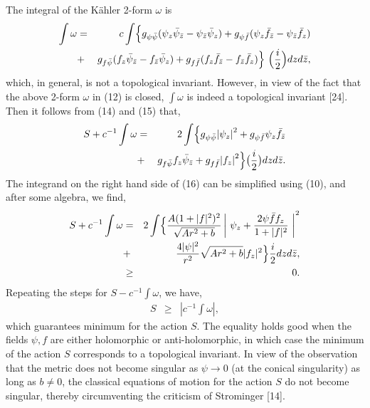 \documentclass[a4paper,12pt]{article}
\begin{document}
{{\vspace{0.5cm}

The integral of the K\"{a}hler 2-form $\omega$ is
\begin{eqnarray}
\int \omega &=& c\int \Bigl \{ g_{\psi \bar{\psi}}({\psi}_z{\bar{\psi}}
_{\bar{z}}-{\psi}_{\bar{z}}{\bar{\psi}}_z)
+g_{\psi \bar{f}}({\psi}_z{\bar{f}}_
{\bar{z}}-{\psi}_{\bar{z}}{\bar{f}}_z) \nonumber \\
&+& g_{f\bar{\psi}}(f_z{\bar{\psi}}_{\bar{z}}-f_{\bar{z}}{\bar{\psi}}_z)
+g_{f\bar{f}}(f_z{\bar{f}}_{\bar{z}}-f_{\bar{z}}{\bar{f}}_z)\Bigr\}\ 
 \Big(\frac{i}{2}\Big) dz d\bar{z},
\end{eqnarray}
which, in general, is not a topological invariant. However, in view of the fact 
that the above 2-form $\omega$ in (12) is closed, $\int \omega$ is 
indeed a topological invariant [24]. Then it follows from (14) and (15) that,
\begin{eqnarray}
S+c^{-1}\int \omega &=& 2\int \Bigl\{ g_{\psi \bar{\psi}}{|{\psi}_z|}^2
+g_{\psi \bar{f}}{\psi}_z {\bar{f}}_{\bar{z}} \nonumber \\
&+& g_{f\bar{\psi}} f_z {\bar{\psi}}_{\bar{z}}+g_{f\bar{f}}{|f_z|}^2
\Bigr\} \big( \frac{i}{2}\big) dz d\bar{z}.
\end{eqnarray}
The integrand on the right hand side of (16) can be simplified using (10),
and after some algebra, we find,
\begin{eqnarray}
S+c^{-1}\int \omega &=& 2\int \Bigl\{ \frac{A(1+|f|^2)^2}{\sqrt{Ar^2+b}}
\left |\ {\psi}_z + \frac{2\psi \bar{f} f_z}{1+|f|^2}\ \right |^2  \nonumber \\
&+& \frac{4|\psi|^2}{r^2}\sqrt{Ar^2+b} |f_z|^2 \Bigr\} \frac{i}{2} dz d\bar{z},
\nonumber \\
&\geq & 0.
\end{eqnarray}
Repeating the steps for $S-c^{-1}\int \omega$, we have,
\begin{eqnarray}
S &\geq & |c^{-1}\int \omega|,
\end{eqnarray}
which guarantees  minimum for the action $S$. The equality holds good when
the fields $\psi, f$ are either holomorphic or 
anti-holomorphic, in which case the minimum
of the action $S$ corresponds to a topological invariant. In view of 
the observation that the metric does not become singular as $\psi 
\rightarrow 0$ (at the conical singularity)  as long as $b\neq 0$, the 
classical equations of motion for the action $S$ do not become singular,
thereby circumventing the criticism of Strominger [14].  

}}
\end{document}
